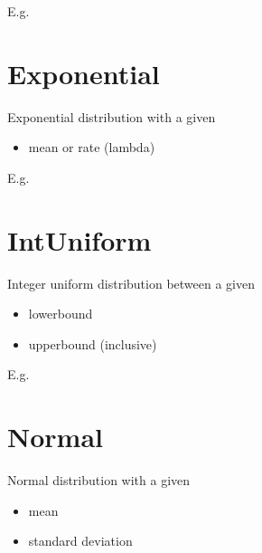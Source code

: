 \documentclass[letterpaper,10pt,english]{sphinxmanual}
\begin{document}
E.g.

\begin{sphinxVerbatim}[commandchars=\\\{\}]
    
\end{sphinxVerbatim}


\section{Exponential}
\label{\detokenize{Distributions:exponential}}
Exponential distribution with a given
\begin{itemize}
\item {} 
mean or rate (lambda)

\end{itemize}

E.g.

\begin{sphinxVerbatim}[commandchars=\\\{\}]
    
\end{sphinxVerbatim}


\section{IntUniform}
\label{\detokenize{Distributions:intuniform}}
Integer uniform distribution between a given
\begin{itemize}
\item {} 
lowerbound

\item {} 
upperbound (inclusive)

\end{itemize}

E.g.

\begin{sphinxVerbatim}[commandchars=\\\{\}]
   
\end{sphinxVerbatim}


\section{Normal}
\label{\detokenize{Distributions:normal}}
Normal distribution with a given
\begin{itemize}
\item {} 
mean

\item {} 
standard deviation

\end{itemize}
\end{document}

